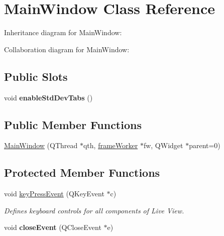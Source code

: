 \hypertarget{classMainWindow}{\section{Main\+Window Class Reference}
\label{classMainWindow}
}


Inheritance diagram for Main\+Window\+:


Collaboration diagram for Main\+Window\+:
\subsection*{Public Slots}
\begin{DoxyCompactItemize}
\item 
\hypertarget{classMainWindow_a2c19745d0ec8910c8ad65e772e9d00da}{void {\bfseries enable\+Std\+Dev\+Tabs} ()}\label{classMainWindow_a2c19745d0ec8910c8ad65e772e9d00da}

\end{DoxyCompactItemize}
\subsection*{Public Member Functions}
\begin{DoxyCompactItemize}
\item 
\hyperlink{classMainWindow_a5f25d4e03143f73e241791a6f5583227}{Main\+Window} (Q\+Thread $\ast$qth, \hyperlink{classframeWorker}{frame\+Worker} $\ast$fw, Q\+Widget $\ast$parent=0)
\end{DoxyCompactItemize}
\subsection*{Protected Member Functions}
\begin{DoxyCompactItemize}
\item 
\hypertarget{classMainWindow_ad860bc2288783517dccabc60a9741258}{void \hyperlink{classMainWindow_ad860bc2288783517dccabc60a9741258}{key\+Press\+Event} (Q\+Key\+Event $\ast$c)}\label{classMainWindow_ad860bc2288783517dccabc60a9741258}

\begin{DoxyCompactList}\small\item\em Defines keyboard controls for all components of Live View. \end{DoxyCompactList}\item 
\hypertarget{classMainWindow_a8a5bf36f9544ed3ec3a9eea9b7154564}{void {\bfseries close\+Event} (Q\+Close\+Event $\ast$e)}\label{classMainWindow_a8a5bf36f9544ed3ec3a9eea9b7154564}

\end{DoxyCompactItemize}


